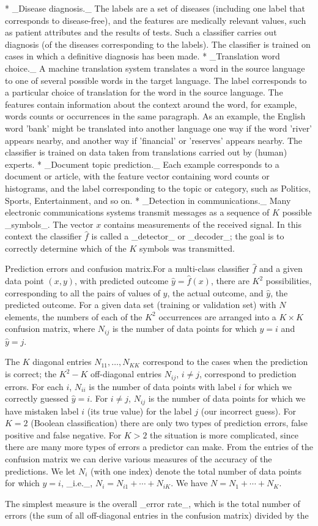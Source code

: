* _Disease diagnosis._ The labels are a set of diseases (including one label that corresponds to disease-free), and the features are medically relevant values, such as patient attributes and the results of tests. Such a classifier carries out diagnosis (of the diseases corresponding to the labels). The classifier is trained on cases in which a definitive diagnosis has been made.
* _Translation word choice._ A machine translation system translates a word in the source language to one of several possible words in the target language. The label corresponds to a particular choice of translation for the word in the source language. The features contain information about the context around the word, for example, words counts or occurrences in the same paragraph. As an example, the English word 'bank' might be translated into another language one way if the word 'river' appears nearby, and another way if 'financial' or 'reserves' appears nearby. The classifier is trained on data taken from translations carried out by (human) experts.
* _Document topic prediction._ Each example corresponds to a document or article, with the feature vector containing word counts or histograms, and the label corresponding to the topic or category, such as Politics, Sports, Entertainment, and so on.
* _Detection in communications._ Many electronic communications systems transmit messages as a sequence of \(K\) possible _symbols_. The vector \(x\) contains measurements of the received signal. In this context the classifier \(\hat{f}\) is called a _detector_ or _decoder_; the goal is to correctly determine which of the \(K\) symbols was transmitted.

Prediction errors and confusion matrix.For a multi-class classifier \(\hat{f}\) and a given data point \((x,y)\), with predicted outcome \(\hat{y}=\hat{f}(x)\), there are \(K^{2}\) possibilities, corresponding to all the pairs of values of \(y\), the actual outcome, and \(\hat{y}\), the predicted outcome. For a given data set (training or validation set) with \(N\) elements, the numbers of each of the \(K^{2}\) occurrences are arranged into a \(K\times K\) confusion matrix, where \(N_{ij}\) is the number of data points for which \(y=i\) and \(\hat{y}=j\).

The \(K\) diagonal entries \(N_{11},\ldots,N_{KK}\) correspond to the cases when the prediction is correct; the \(K^{2}-K\) off-diagonal entries \(N_{ij}\), \(i\neq j\), correspond to prediction errors. For each \(i\), \(N_{ii}\) is the number of data points with label \(i\) for which we correctly guessed \(\hat{y}=i\). For \(i\neq j\), \(N_{ij}\) is the number of data points for which we have mistaken label \(i\) (its true value) for the label \(j\) (our incorrect guess). For \(K=2\) (Boolean classification) there are only two types of prediction errors, false positive and false negative. For \(K>2\) the situation is more complicated, since there are many more types of errors a predictor can make. From the entries of the confusion matrix we can derive various measures of the accuracy of the predictions. We let \(N_{i}\) (with one index) denote the total number of data points for which \(y=i\), _i.e._, \(N_{i}=N_{i1}+\cdots+N_{iK}\). We have \(N=N_{1}+\cdots+N_{K}\).

The simplest measure is the overall _error rate_, which is the total number of errors (the sum of all off-diagonal entries in the confusion matrix) divided by the 